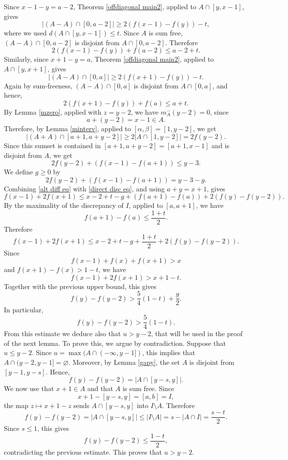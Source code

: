 \documentclass[11pt,reqno]{amsart}
\theoremstyle{definition}
\def\F#1{f(#1)}
\begin{document}
Since $x-1-y=a-2$, Theorem \ref{offdiagonal main2}, applied to $A\cap[y,x-1]$, gives
$$
    |(A-A)\cap[0,a-2]|
    \geq 2(\F{x-1}-\F{y})-t,
$$
where we used $d(A\cap[y,x-1])\leq t$. Since $A$ is sum free, $(A-A)\cap[0,a-2]$ is disjoint from $A\cap[0,a-2]$. Therefore
\begin{equation} \label{diff eq}
    2(\F{x-1}-\F{y})+\F{a-2}\leq a-2+t.
\end{equation}
Similarly, since $x+1-y=a$, Theorem \ref{offdiagonal main2}, applied to $A\cap[y,x+1]$, gives
$$
    |(A-A)\cap[0,a]|
    \geq 2(\F{x+1}-\F{y})-t.
$$
Again by sum-freeness, $(A-A)\cap[0,a]$ is disjoint from $A\cap[0,a]$, and hence,  
\begin{equation} \label{alt diff eq}
    2(\F{x+1}-\F{y})+\F{a}\leq a+t.
\end{equation}
By Lemma \ref{mzero}, applied with $z=y-2$, we have $m_A^-(y-2)=0$, since
$$
    a+(y-2)=x-1\in A.
$$
Therefore, by Lemma \ref{minterv}, applied to
$[\alpha,\beta]=[1,y-2]$, we get
$$
    |(A+A)\cap[a+1,a+y-2]|
    \geq 2|A\cap[1,y-2]|
    =
    2\F{y-2}.
$$
Since this sumset is contained in $[a+1,a+y-2]=[a+1,x-1]$ and is disjoint from $A$, we get
$$
    2\F{y-2}+(\F{x-1}-\F{a+1})\leq y-3.
$$
We define $g\geq0$ by
\begin{equation} \label{direct disc eq}
    2\F{y-2}+(\F{x-1}-\F{a+1})=y-3-g.
\end{equation}
Combining \eqref{alt diff eq} with \eqref{direct disc eq}, and using $a+y=x+1$, gives
$$
    \F{x-1}+2\F{x+1}
    \leq x-2+t-g+(\F{a+1}-\F{a})+2(\F{y}-\F{y-2}).
$$
By the maximality of the discrepancy of $I$, applied to $[a,a+1]$, we have
$$
    \F{a+1}-\F{a}\leq \frac{1+t}{2}.
$$
Therefore
$$
    \F{x-1}+2\F{x+1}
    \leq
    x-2+t-g+\frac{1+t}{2}+2(\F{y}-\F{y-2}).
$$
Since
$$
    \F{x-1}+\F{x}+\F{x+1}>x
$$
and $\F{x+1}-\F{x}>1-t$, we have
$$
    \F{x-1}+2\F{x+1}>x+1-t.
$$
Together with the previous upper bound, this gives
$$
    \F{y}-\F{y-2}>\frac{5}{4}(1-t)+\frac{g}{2}.
$$
In particular,
$$
    \F{y}-\F{y-2}>\frac{5}{4}(1-t).
$$
From this estimate we deduce also that $u>y-2$, that will be used in
the proof of the next lemma. To prove this, we argue by contradiction. Suppose
that $u\leq y-2$. Since $u=\max(A\cap (-\infty,y-1])$, this implies that
$A\cap (y-2,y-1]=\varnothing$. Moreover, by Lemma \ref{gapy}, the set $A$ is
disjoint from $[y-1,y-s]$. Hence,  
$$
\F{y}-\F{y-2}=|A\cap [y-s,y]|.
$$
We now use that $x+1\in A$ and that $A$ is sum free. Since
$$
x+1-[y-s,y]=[a,b]=I,
$$
the map $z\mapsto x+1-z$ sends $A\cap [y-s,y]$ into $I\setminus A$. Therefore
$$
\F{y}-\F{y-2}
=
|A\cap [y-s,y]|
\leq |I\setminus A|
=
s-|A\cap I|
=
\frac{s-t}{2}.
$$
Since $s\leq 1$, this gives
$$
\F{y}-\F{y-2}\leq \frac{1-t}{2},
$$
contradicting the previous estimate. This proves that $u>y-2$.
\end{document}

